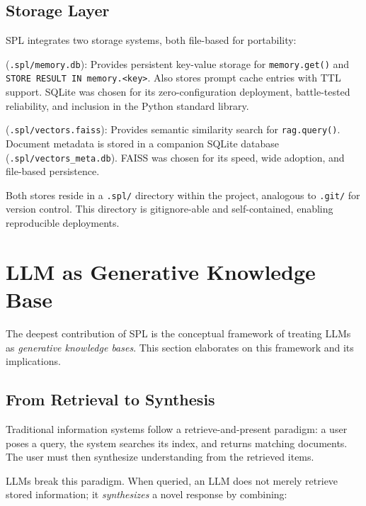 \documentclass[11pt,a4paper]{article}
\begin{document}
\subsection{Storage Layer}

SPL integrates two storage systems, both file-based for portability:

\begin{description}[nosep]
  \item[SQLite Memory Store] (\texttt{.spl/memory.db}): Provides persistent key-value storage for \texttt{memory.get()} and \texttt{STORE RESULT IN memory.<key>}. Also stores prompt cache entries with TTL support. SQLite was chosen for its zero-configuration deployment, battle-tested reliability, and inclusion in the Python standard library.
  \item[FAISS Vector Store] (\texttt{.spl/vectors.faiss}): Provides semantic similarity search for \texttt{rag.query()}. Document metadata is stored in a companion SQLite database (\texttt{.spl/vectors\_meta.db}). FAISS was chosen for its speed, wide adoption, and file-based persistence.
\end{description}

Both stores reside in a \texttt{.spl/} directory within the project, analogous to \texttt{.git/} for version control. This directory is gitignore-able and self-contained, enabling reproducible deployments.

\section{LLM as Generative Knowledge Base}
\label{sec:generative-kb}

The deepest contribution of SPL is the conceptual framework of treating LLMs as \emph{generative knowledge bases}. This section elaborates on this framework and its implications.

\subsection{From Retrieval to Synthesis}

Traditional information systems follow a retrieve-and-present paradigm: a user poses a query, the system searches its index, and returns matching documents. The user must then synthesize understanding from the retrieved items.

LLMs break this paradigm. When queried, an LLM does not merely retrieve stored information; it \emph{synthesizes} a novel response by combining:
\end{document}
